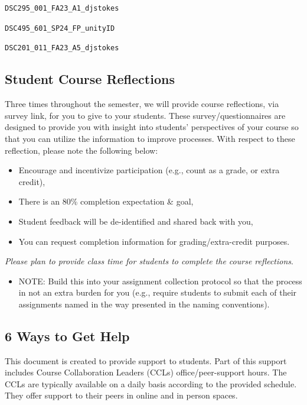\documentclass[
]{book}
\providecommand{\tightlist}{%
  \setlength{\itemsep}{0pt}\setlength{\parskip}{0pt}}
\begin{document}
\texttt{DSC295\_001\_FA23\_A1\_djstokes}

\texttt{DSC495\_601\_SP24\_FP\_unityID}

\texttt{DSC201\_011\_FA23\_A5\_djstokes}

\hypertarget{student-course-reflections}{%
\subsection{Student Course Reflections}\label{student-course-reflections}}

Three times throughout the semester, we will provide course reflections, via survey link, for you to give to your students. These survey/questionnaires are designed to provide you with insight into students' perspectives of your course so that you can utilize the information to improve processes. With respect to these reflection, please note the following below:

\begin{itemize}
\tightlist
\item
  Encourage and incentivize participation (e.g., count as a grade, or extra credit),
\item
  There is an 80\% completion expectation \& goal,
\item
  Student feedback will be de-identified and shared back with you,
\item
  You can request completion information for grading/extra-credit purposes.
\end{itemize}

{ \emph{Please plan to provide class time for students to complete the course reflections}. }

\begin{itemize}
\tightlist
\item
  NOTE: Build this into your assignment collection protocol so that the process in not an extra burden for you (e.g., require students to submit each of their assignments named in the way presented in the naming conventions).
\end{itemize}

\hypertarget{ways-to-get-help}{%
\subsection{6 Ways to Get Help}\label{ways-to-get-help}}

This document is created to provide support to students. Part of this support includes Course Collaboration Leaders (CCLs) office/peer-support hours. The CCLs are typically available on a daily basis according to the provided schedule. They offer support to their peers in online and in person spaces.
\end{document}
